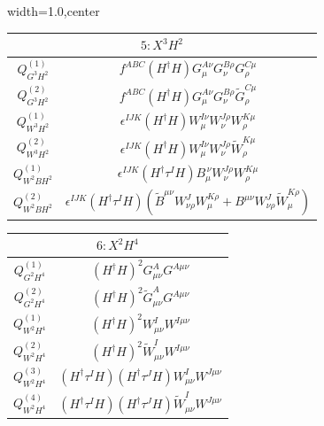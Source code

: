 \begin{table}[H]
\begin{center}
\begin{adjustbox}{width=1.0\textwidth,center}
\small
\begin{minipage}[t]{8cm}
\renewcommand{\arraystretch}{1.5}
\begin{tabular}[t]{c|c}
\multicolumn{2}{c}{\boldmath$5:X^3H^2$} \\
\hline
$Q_{G^3H^2}^{(1)}$  &  $f^{ABC} (H^\dag H) G_{\mu}^{A\nu} G_{\nu}^{B\rho} G_{\rho}^{C\mu}$ \\
%
$Q_{G^3H^2}^{(2)}$  &  $f^{ABC} (H^\dag H) G_{\mu}^{A\nu} G_{\nu}^{B\rho} \widetilde{G}_{\rho}^{C\mu}$ \\
%
$Q_{W^3H^2}^{(1)}$  &  $\epsilon^{IJK} (H^\dag H) W_{\mu}^{I\nu} W_{\nu}^{J\rho} W_{\rho}^{K\mu}$ \\
%
$Q_{W^3H^2}^{(2)}$  &  $\epsilon^{IJK} (H^\dag H) W_{\mu}^{I\nu} W_{\nu}^{J\rho} \widetilde{W}_{\rho}^{K\mu}$ \\
%
$Q_{W^2BH^2}^{(1)}$  &  $\epsilon^{IJK} (H^\dag \tau^I H) B_{\mu}^{\,\nu} W_{\nu}^{J\rho} W_{\rho}^{K\mu}$ \\
%
$Q_{W^2BH^2}^{(2)}$  &  $\epsilon^{IJK} (H^\dag \tau^I H) (\widetilde{B}^{\mu\nu} W_{\nu\rho}^J W_{\mu}^{K\rho} + B^{\mu\nu} W_{\nu\rho}^J \widetilde{W}_{\mu}^{K\rho})$
\end{tabular}
\end{minipage}
\hspace{1cm}
\begin{minipage}[t]{6cm}
\renewcommand{\arraystretch}{1.5}
\begin{tabular}[t]{c|c}
\multicolumn{2}{c}{\boldmath$6:X^2H^4$} \\
\hline
$Q_{G^2H^4}^{(1)}$  & $(H^\dag H)^2 G^A_{\mu\nu} G^{A\mu\nu}$ \\
%
$Q_{G^2H^4}^{(2)}$  & $(H^\dag H)^2 \widetilde G^A_{\mu\nu} G^{A\mu\nu}$ \\
%
$Q_{W^2H^4}^{(1)}$  & $(H^\dag H)^2 W^I_{\mu\nu} W^{I\mu\nu}$ \\
%
$Q_{W^2H^4}^{(2)}$  & $(H^\dag H)^2 \widetilde W^I_{\mu\nu} W^{I\mu\nu}$ \\
%
$Q_{W^2H^4}^{(3)}$  & $(H^\dag \tau^I H) (H^\dag \tau^J H) W^I_{\mu\nu} W^{J\mu\nu}$ \\
%
$Q_{W^2H^4}^{(4)}$  & $(H^\dag \tau^I H) (H^\dag \tau^J H) \widetilde W^I_{\mu\nu} W^{J\mu\nu}$ \\

\end{tabular}
\end{minipage}
\end{adjustbox}
\end{center}
\end{table}
